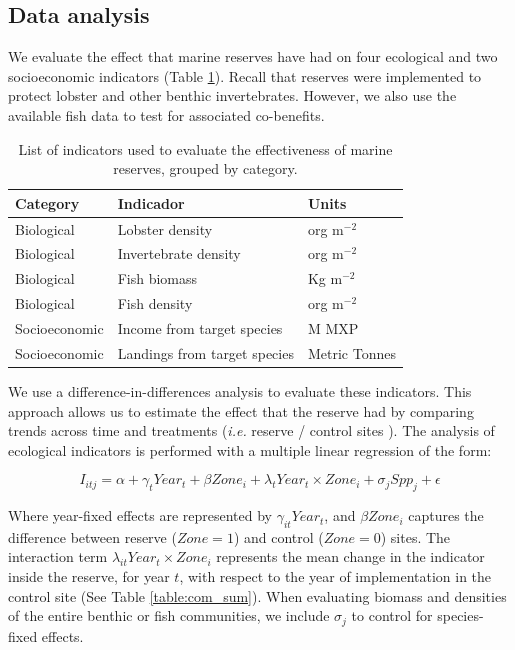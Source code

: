 \documentclass{frontiersSCNS}
\begin{document}
\subsection{Data analysis}\label{data-analysis}

We evaluate the effect that marine reserves have had on four ecological
and two socioeconomic indicators (Table \ref{table:indicators}). Recall
that reserves were implemented to protect lobster and other benthic
invertebrates. However, we also use the available fish data to test for
associated co-benefits.

\begin{table}[H]

\caption{\label{tab:unnamed-chunk-3}\label{table:indicators}List of indicators used to evaluate the effectiveness of marine reserves, grouped by category.}
\centering
\begin{tabular}[t]{l|l|l}
\hline
Category & Indicador & Units\\
\hline
Biological & Lobster density & org $\mathrm{m}^{-2}$\\
\hline
Biological & Invertebrate density & org $\mathrm{m}^{-2}$\\
\hline
Biological & Fish biomass & Kg $\mathrm{m}^{-2}$\\
\hline
Biological & Fish density & org $\mathrm{m}^{-2}$\\
\hline
Socioeconomic & Income from target species & M MXP\\
\hline
Socioeconomic & Landings from target species & Metric Tonnes\\
\hline
\end{tabular}
\end{table}

We use a difference-in-differences analysis to evaluate these
indicators. This approach allows us to estimate the effect that the
reserve had by comparing trends across time and treatments (\emph{i.e.}
reserve / control sites \citet{moland_2013-VP,Villasenor-Derbez_2018}).
The analysis of ecological indicators is performed with a multiple
linear regression of the form:

\begin{equation}
I_{itj} = \alpha + \gamma_{t} Year_t + \beta Zone_i + \lambda_{t} Year_t\times Zone_i + \sigma_jSpp_j + \epsilon
\label{eqn:reg_bio}
\end{equation}

Where year-fixed effects are represented by \(\gamma_{it} Year_t\), and
\(\beta Zone_i\) captures the difference between reserve (\(Zone = 1\))
and control (\(Zone = 0\)) sites. The interaction term
\(\lambda_{it} Year_t\times Zone_i\) represents the mean change in the
indicator inside the reserve, for year \(t\), with respect to the year
of implementation in the control site (See Table \ref{table:com_sum}).
When evaluating biomass and densities of the entire benthic or fish
communities, we include \(\sigma_j\) to control for species-fixed
effects.
\end{document}
